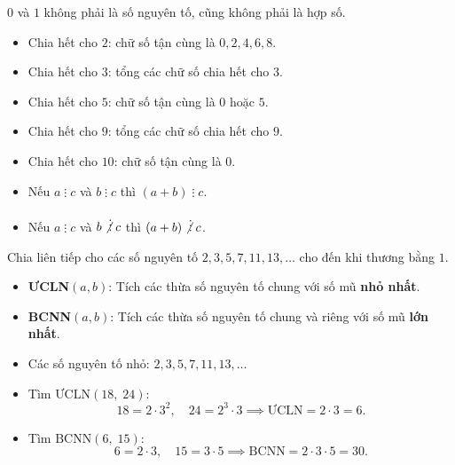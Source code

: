\documentclass[12pt,a4paper]{article}
\begin{document}
\begin{luuy}
$0$ và $1$ không phải là số nguyên tố, cũng không phải là hợp số.
\end{luuy}

\begin{tinhchat}[title={Dấu hiệu chia hết}]
\begin{itemize}
  \item Chia hết cho $2$: chữ số tận cùng là $0, 2, 4, 6, 8$.
  \item Chia hết cho $3$: tổng các chữ số chia hết cho $3$.
  \item Chia hết cho $5$: chữ số tận cùng là $0$ hoặc $5$.
  \item Chia hết cho $9$: tổng các chữ số chia hết cho $9$.
  \item Chia hết cho $10$: chữ số tận cùng là $0$.
\end{itemize}
\end{tinhchat}

\begin{tinhchat}[title={Tính chất chia hết}]
\begin{itemize}
  \item Nếu $a \mathrel{\vdots} c$ và $b \mathrel{\vdots} c$ thì $(a + b) \mathrel{\vdots} c$.
  \item Nếu $a \mathrel{\vdots} c$ và $b \mathrel{\not\vdots} c$ thì $(a + b) \mathrel{\not\vdots} c$.
\end{itemize}
\end{tinhchat}

\begin{phuongphap}[title={Phân tích ra thừa số nguyên tố}]
Chia liên tiếp cho các số nguyên tố $2, 3, 5, 7, 11, 13, \ldots$ cho đến khi thương bằng $1$.
\end{phuongphap}

\begin{congthuc}[title={ƯCLN và BCNN}]
\begin{itemize}
  \item \textbf{ƯCLN}$(a, b)$: Tích các thừa số nguyên tố chung với số mũ \textbf{nhỏ nhất}.
  \item \textbf{BCNN}$(a, b)$: Tích các thừa số nguyên tố chung và riêng với số mũ \textbf{lớn nhất}.
\end{itemize}
\end{congthuc}

\begin{vidu}
\begin{itemize}
  \item Các số nguyên tố nhỏ: $2, 3, 5, 7, 11, 13, \ldots$
  \item Tìm $\text{ƯCLN}(18,\; 24)$:
    \[18 = 2 \cdot 3^2, \quad 24 = 2^3 \cdot 3 \implies \text{ƯCLN} = 2 \cdot 3 = 6.\]
  \item Tìm $\text{BCNN}(6,\; 15)$:
    \[6 = 2 \cdot 3, \quad 15 = 3 \cdot 5 \implies \text{BCNN} = 2 \cdot 3 \cdot 5 = 30.\]
\end{itemize}
\end{vidu}
\end{document}
